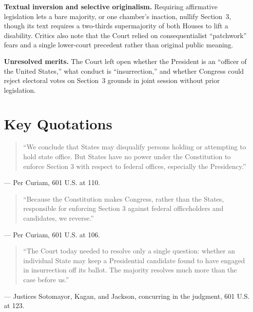 \documentclass[12pt]{article}
\begin{document}
\textbf{Textual inversion and selective originalism.} Requiring affirmative legislation lets a bare majority, or one chamber's inaction, nullify Section~3, though its text requires a two-thirds supermajority of both Houses to lift a disability. Critics also note that the Court relied on consequentialist ``patchwork'' fears and a single lower-court precedent rather than original public meaning.

\textbf{Unresolved merits.} The Court left open whether the President is an ``officer of the United States,'' what conduct is ``insurrection,'' and whether Congress could reject electoral votes on Section~3 grounds in joint session without prior legislation.

\section{Key Quotations}

\begin{quote}
``We conclude that States may disqualify persons holding or attempting to hold state office. But States have no power under the Constitution to enforce Section 3 with respect to federal offices, especially the Presidency.''
\end{quote}
\noindent --- Per Curiam, 601 U.S. at 110.

\begin{quote}
``Because the Constitution makes Congress, rather than the States, responsible for enforcing Section 3 against federal officeholders and candidates, we reverse.''
\end{quote}
\noindent --- Per Curiam, 601 U.S. at 106.

\begin{quote}
``The Court today needed to resolve only a single question: whether an individual State may keep a Presidential candidate found to have engaged in insurrection off its ballot. The majority resolves much more than the case before us.''
\end{quote}
\noindent --- Justices Sotomayor, Kagan, and Jackson, concurring in the judgment, 601 U.S. at 123.
\end{document}
